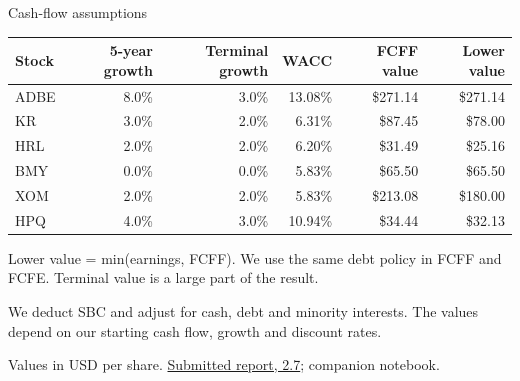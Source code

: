 \documentclass[aspectratio=169,11pt,t]{beamer}
\newcommand{\source}[1]{\par\vfill{\fontsize{6.3}{8}\selectfont\color{muted}#1\par}}
\newcommand{\reportsection}[1]{\href{https://kybeka.github.io/meridian-capital/materials/round-2-report.pdf}{Submitted report, #1}}
\newcommand{\tablefont}{\fontsize{9}{11.5}\selectfont}
\begin{document}
\begin{frame}{Cash-flow assumptions}

\tablefont\begin{tabularx}{\textwidth}{@{}Xrrrrr@{}}\toprule
Stock & 5-year growth & Terminal growth & WACC & FCFF value & Lower value\\\midrule
ADBE&8.0\%&3.0\%&13.08\%&\$271.14&\$271.14\\
KR&3.0\%&2.0\%&6.31\%&\$87.45&\$78.00\\
HRL&2.0\%&2.0\%&6.20\%&\$31.49&\$25.16\\
BMY&0.0\%&0.0\%&5.83\%&\$65.50&\$65.50\\
XOM&2.0\%&2.0\%&5.83\%&\$213.08&\$180.00\\
HPQ&4.0\%&3.0\%&10.94\%&\$34.44&\$32.13\\
\bottomrule\end{tabularx}\par\vspace{.20cm}
\small Lower value = min(earnings, FCFF). We use the same debt policy in FCFF and FCFE. Terminal value is a large part of the result.
\par\vspace{.25cm}\small
We deduct SBC and adjust for cash, debt and minority interests. The values depend on our starting cash flow, growth and discount rates.
\source{Values in USD per share. \reportsection{2.7}; companion notebook.}

\end{frame}
\end{document}
